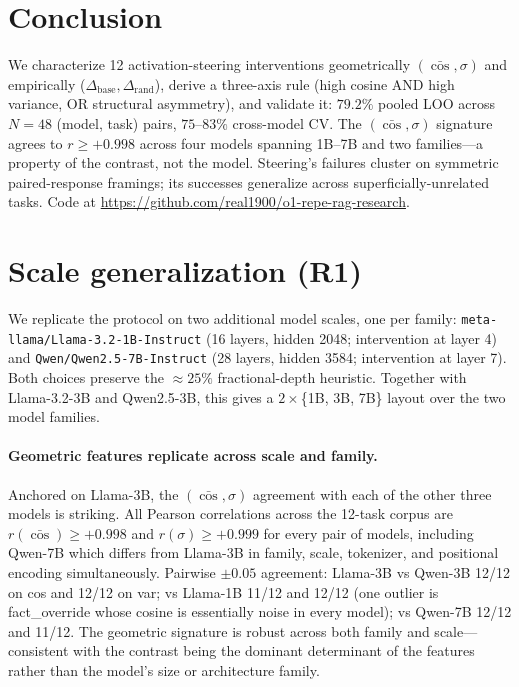\documentclass[11pt]{article}
\begin{document}
\section{Conclusion}

We characterize 12 activation-steering interventions geometrically
$(\bar{\cos}, \sigma)$ and empirically
($\Delta_{\text{base}}, \Delta_{\text{rand}}$), derive a three-axis
rule (high cosine AND high variance, OR structural asymmetry), and
validate it: $79.2\%$ pooled LOO across $N{=}48$ (model, task)
pairs, $75$--$83\%$ cross-model CV. The $(\bar{\cos}, \sigma)$
signature agrees to $r \geq +0.998$ across four models spanning
1B--7B and two families---a property of the contrast, not the
model. Steering's failures cluster on symmetric paired-response
framings; its successes generalize across superficially-unrelated
tasks. Code at
\url{https://github.com/real1900/o1-repe-rag-research}.



\appendix
\section{Scale generalization (R1)}
\label{app:scale}

We replicate the protocol on two additional model scales, one per
family: \texttt{meta-llama/Llama-3.2-1B-Instruct} (16 layers,
hidden 2048; intervention at layer 4) and
\texttt{Qwen/Qwen2.5-7B-Instruct} (28 layers, hidden 3584;
intervention at layer 7). Both choices preserve the $\approx 25\%$
fractional-depth heuristic. Together with Llama-3.2-3B and
Qwen2.5-3B, this gives a $2 \times$\{1B, 3B, 7B\} layout over the
two model families.

\paragraph{Geometric features replicate across scale and family.}
Anchored on Llama-3B, the $(\bar{\cos}, \sigma)$ agreement with each
of the other three models is striking. All Pearson correlations
across the 12-task corpus are $r(\bar{\cos}) \geq +0.998$ and
$r(\sigma) \geq +0.999$ for every pair of models, including
Qwen-7B which differs from Llama-3B in family, scale, tokenizer,
and positional encoding simultaneously. Pairwise $\pm 0.05$
agreement: Llama-3B vs Qwen-3B 12/12 on cos and 12/12 on var;
vs Llama-1B 11/12 and 12/12 (one outlier is fact\_override whose
cosine is essentially noise in every model); vs Qwen-7B 12/12 and
11/12. The geometric signature is robust across both family and
scale---consistent with the contrast being the dominant determinant
of the features rather than the model's size or architecture family.
\end{document}

